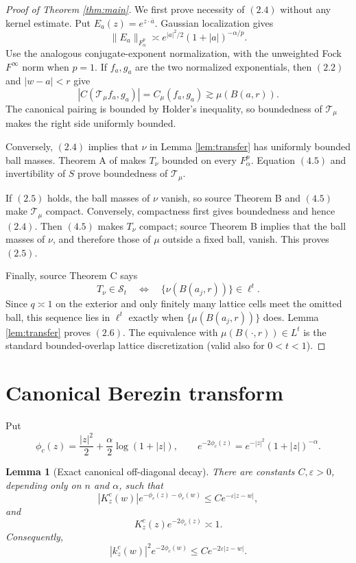 \documentclass[11pt]{article}
\newtheorem{lemma}[theorem]{Lemma}
\newcommand{\Fc}[2]{F^{#1}_{#2}}
\newcommand{\Sc}{\mathcal S}
\newcommand{\Tc}{\mathcal T}
\newcommand{\Tm}{T}
\begin{document}
\begin{proof}[Proof of Theorem \ref{thm:main}]
We first prove necessity of \((2.4)\) without any kernel estimate.  Put
\(E_a(z)=e^{z\cdot\overline a}\).  Gaussian localization gives
\[
 \|E_a\|_{\Fc p\alpha}\asymp
 e^{|a|^2/2}(1+|a|)^{-\alpha/p}.                                  \tag{4.7}
\]
Use the analogous conjugate-exponent normalization, with the unweighted
Fock \(F^\infty\) norm when \(p=1\).  If \(f_a,g_a\) are the two normalized
exponentials, then \((2.2)\) and \(|w-a|<r\) give
\[
 |C(\Tc_\mu f_a,g_a)|=C_\mu(f_a,g_a)\gtrsim\mu(B(a,r)).             \tag{4.8}
\]
The canonical pairing is bounded by Holder's inequality, so boundedness of
\(\Tc_\mu\) makes the right side uniformly bounded.

Conversely, \((2.4)\) implies that \(\nu\) in Lemma \ref{lem:transfer} has
uniformly bounded ball masses.  Theorem A of \cite{CIJ} makes \(\Tm_\nu\)
bounded on every \(\Fc p\alpha\).  Equation \((4.5)\) and invertibility of
\(S\) prove boundedness of \(\Tc_\mu\).

If \((2.5)\) holds, the ball masses of \(\nu\) vanish, so source Theorem B
and \((4.5)\) make \(\Tc_\mu\) compact.  Conversely, compactness first gives
boundedness and hence \((2.4)\).  Then \((4.5)\) makes \(\Tm_\nu\) compact;
source Theorem B implies that the ball masses of \(\nu\), and therefore those
of \(\mu\) outside a fixed ball, vanish.  This proves \((2.5)\).

Finally, source Theorem C says
\[
 \Tm_\nu\in\Sc_t\quad\Longleftrightarrow\quad
 \{\nu(B(a_j,r))\}\in\ell^t.
\]
Since \(q\asymp1\) on the exterior and only finitely many lattice cells meet
the omitted ball, this sequence lies in \(\ell^t\) exactly when
\(\{\mu(B(a_j,r))\}\) does.  Lemma \ref{lem:transfer} proves \((2.6)\).
The equivalence with \(\mu(B(\mathord\cdot,r))\in L^t\) is the standard
bounded-overlap lattice discretization (valid also for \(0<t<1\)).
\end{proof}

\section{Canonical Berezin transform}

Put
\[
 \phi_c(z)=\frac{|z|^2}{2}+\frac{\alpha}{2}\log(1+|z|),
 \qquad e^{-2\phi_c(z)}=e^{-|z|^2}(1+|z|)^{-\alpha}.
\]

\begin{lemma}[Exact canonical off-diagonal decay]\label{lem:canonical-decay}
There are constants \(C,\varepsilon>0\), depending only on \(n\) and
\(\alpha\), such that
\[
 |K^c_z(w)|e^{-\phi_c(z)-\phi_c(w)}
 \leq C e^{-\varepsilon|z-w|},                                   \tag{5.1}
\]
and
\[
 K^c_z(z)e^{-2\phi_c(z)}\asymp1.                                 \tag{5.2}
\]
Consequently,
\[
 |k^c_z(w)|^2e^{-2\phi_c(w)}\leq C e^{-2\varepsilon|z-w|}.       \tag{5.3}
\]
\end{lemma}
\end{document}
